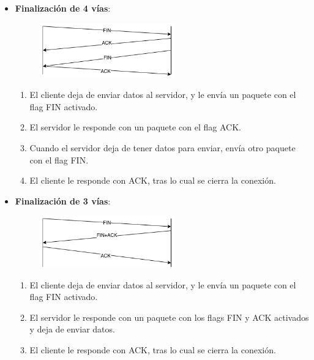 \begin{itemize}
    \item \textbf{Finalización de 4 vías}:
\begin{figure}[H]
    \centering
    \includegraphics[width=0.55\textwidth]{img/FIN4.png}
\end{figure}
    \begin{enumerate}
        \item El cliente deja de enviar datos al servidor, y le envía un paquete con el flag FIN activado.
        \item El servidor le responde con un paquete con el flag ACK.
        \item Cuando el servidor deja de tener datos para enviar, envía otro paquete con el flag FIN.
        \item El cliente le responde con ACK, tras lo cual se cierra la conexión.
    \end{enumerate}
    \item \textbf{Finalización de 3 vías}:
\begin{figure}[H]
    \centering
    \includegraphics[width=0.55\textwidth]{img/FIN3.png}
\end{figure}
    \begin{enumerate}
        \item El cliente deja de enviar datos al servidor, y le envía un paquete con el flag FIN activado.
        \item El servidor le responde con un paquete con los flags FIN y ACK activados y deja de enviar datos.
        \item El cliente le responde con ACK, tras lo cual se cierra la conexión.
    \end{enumerate}

\end{itemize}
